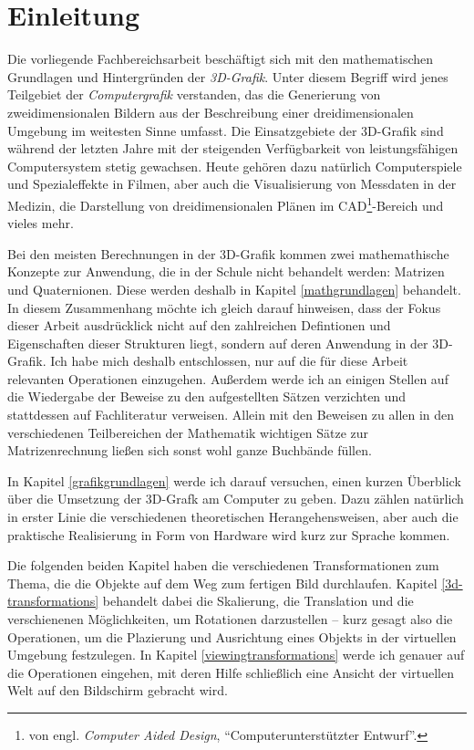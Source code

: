 \chapter{Einleitung}

Die vorliegende Fachbereichsarbeit beschäftigt sich mit den mathematischen Grundlagen und Hintergründen der \emph{3D-Grafik}. Unter diesem Begriff wird jenes Teilgebiet der \emph{Computergrafik} verstanden, das die Generierung von zweidimensionalen Bildern aus der Beschreibung einer dreidimensionalen Umgebung im weitesten Sinne umfasst. Die Einsatzgebiete der 3D-Grafik sind während der letzten Jahre mit der steigenden Verfügbarkeit von leistungsfähigen Computersystem stetig gewachsen. Heute gehören dazu natürlich Computerspiele und Spezialeffekte in Filmen, aber auch die Visualisierung von Messdaten in der Medizin, die Darstellung von dreidimensionalen Plänen im CAD\footnote{von engl. \emph{Computer Aided Design}, \enquote{Computerunterstützter Entwurf}.}-Bereich und vieles mehr.

Bei den meisten Berechnungen in der 3D-Grafik kommen zwei mathemathische Konzepte zur Anwendung, die in der Schule nicht behandelt werden: Matrizen und Quaternionen. Diese werden deshalb in Kapitel \ref{mathgrundlagen} behandelt. In diesem Zusammenhang möchte ich gleich darauf hinweisen, dass der Fokus dieser Arbeit ausdrücklick nicht auf den zahlreichen Defintionen und Eigenschaften dieser Strukturen liegt, sondern auf deren Anwendung in der 3D-Grafik.  Ich habe mich deshalb entschlossen, nur auf die für diese Arbeit relevanten Operationen einzugehen. Außerdem werde ich an einigen Stellen auf die Wiedergabe der Beweise zu den aufgestellten Sätzen verzichten und stattdessen auf Fachliteratur verweisen. Allein mit den Beweisen zu allen in den verschiedenen Teilbereichen der Mathematik wichtigen Sätze zur Matrizenrechnung ließen sich sonst wohl ganze Buchbände füllen.

In Kapitel \ref{grafikgrundlagen} werde ich darauf versuchen, einen kurzen Überblick über die Umsetzung der 3D-Grafk am Computer zu geben. Dazu zählen natürlich in erster Linie die verschiedenen theoretischen Herangehensweisen, aber auch die praktische Realisierung in Form von Hardware wird kurz zur Sprache kommen.

Die folgenden beiden Kapitel haben die verschiedenen Transformationen zum Thema, die die Objekte auf dem Weg zum fertigen Bild durchlaufen. Kapitel \ref{3d-transformations} behandelt dabei die Skalierung, die Translation und die verschienenen Möglichkeiten, um Rotationen darzustellen -- kurz gesagt also die Operationen, um die Plazierung und Ausrichtung eines Objekts in der virtuellen Umgebung festzulegen. In Kapitel \ref{viewingtransformations} werde ich genauer auf die Operationen eingehen, mit deren Hilfe schließlich eine Ansicht der virtuellen Welt auf den Bildschirm gebracht wird.


